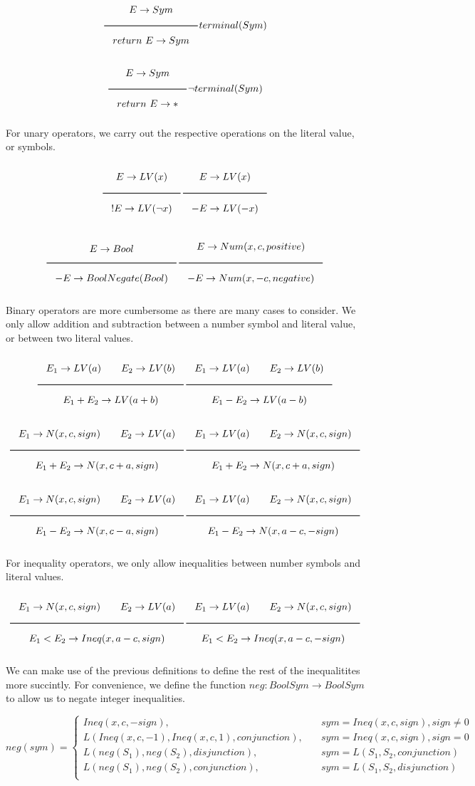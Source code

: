 \[
\Rule{E \eval Sym}
      {return~E \eval Sym}
      terminal(Sym)
    \]
    \[
\Rule{E \eval Sym}
      {return~E \eval *}
\neg terminal(Sym)
\]

\noindent
For unary operators, we carry out the respective operations on the literal value, or symbols.
      
\[
\Rule{E \eval LV(x)}
     {!E \eval LV(\neg x)} \hfill
\Rule{E \eval LV(x)}
     {-E \eval LV(-x)}
\]

\[
\Rule{E \eval Bool}
     {-E \eval BoolNegate(Bool)} \hfill
\Rule{E \eval Num(x,c,positive)}
     {-E \eval Num(x,-c,negative)}
\]

\noindent
Binary operators are more cumbersome as there are many cases to consider. We only allow addition and subtraction between a number symbol and literal value, or between two literal values.

\[
\Rule{E_1 \eval LV(a) \qquad E_2 \eval LV(b)}
      {E_1+E_2 \eval LV(a+b)} \hfill
\Rule{E_1 \eval LV(a) \qquad E_2 \eval LV(b)}
      {E_1-E_2 \eval LV(a-b)}
\]
\[
\Rule{E_1 \eval N(x,c,sign) \qquad E_2 \eval LV(a)}
      {E_1+E_2 \eval N(x,c+a,sign)} \hfill
\Rule{E_1 \eval LV(a) \qquad E_2 \eval N(x,c,sign)}
      {E_1+E_2 \eval N(x,c+a,sign)}
\]
\[
\Rule{E_1 \eval N(x,c,sign) \qquad E_2 \eval LV(a)}
      {E_1-E_2 \eval N(x,c-a,sign)} \hfill
\Rule{E_1 \eval LV(a) \qquad E_2 \eval N(x,c,sign)}
      {E_1-E_2 \eval N(x,a-c,-sign)}
\]

\noindent
For inequality operators, we only allow inequalities between number symbols and literal values.

\[
\Rule{E_1 \eval N(x,c,sign) \qquad E_2 \eval LV(a)}
     {E_1<E_2 \eval Ineq(x,a-c,sign)} \hfill
\Rule{E_1 \eval LV(a) \qquad E_2 \eval N(x,c,sign)}
     {E_1<E_2 \eval Ineq(x,a-c,-sign)}
\]
    
\noindent
We can make use of the previous definitions to define the rest of the inequalitites more succintly.
For convenience, we define the function \(neg : BoolSym \to BoolSym\) to allow us to negate integer inequalities.

\[
  neg(sym) =
  \begin{cases}
    Ineq(x,c,-sign), &\quad sym = Ineq(x,c,sign), sign\neq 0 \\
    L(Ineq(x,c,-1),Ineq(x,c,1),conjunction), &\quad sym = Ineq(x,c,sign), sign = 0 \\
    L(neg(S_1),neg(S_2),disjunction), &\quad sym = L(S_1,S_2,conjunction)\\
    L(neg(S_1),neg(S_2),conjunction), &\quad sym = L(S_1,S_2,disjunction)\\
  \end{cases}
\]


